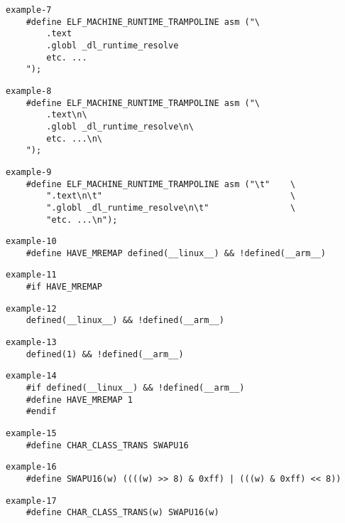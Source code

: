 \documentclass{jsarticle}
\begin{document}
\setlength{\baselineskip}{10pt}

\begin{verbatim}
example-7
    #define ELF_MACHINE_RUNTIME_TRAMPOLINE asm ("\
        .text
        .globl _dl_runtime_resolve
        etc. ...
    ");
\end{verbatim}

\begin{verbatim}
example-8
    #define ELF_MACHINE_RUNTIME_TRAMPOLINE asm ("\
        .text\n\
        .globl _dl_runtime_resolve\n\
        etc. ...\n\
    ");
\end{verbatim}

\begin{verbatim}
example-9
    #define ELF_MACHINE_RUNTIME_TRAMPOLINE asm ("\t"    \
        ".text\n\t"                                     \
        ".globl _dl_runtime_resolve\n\t"                \
        "etc. ...\n");
\end{verbatim}

\vspace{0pt}

\begin{verbatim}
example-10
    #define HAVE_MREMAP defined(__linux__) && !defined(__arm__)
\end{verbatim}

\begin{verbatim}
example-11
    #if HAVE_MREMAP
\end{verbatim}

\begin{verbatim}
example-12
    defined(__linux__) && !defined(__arm__)
\end{verbatim}

\begin{verbatim}
example-13
    defined(1) && !defined(__arm__)
\end{verbatim}

\begin{verbatim}
example-14
    #if defined(__linux__) && !defined(__arm__)
    #define HAVE_MREMAP 1
    #endif
\end{verbatim}

\vspace{0pt}

\begin{verbatim}
example-15
    #define CHAR_CLASS_TRANS SWAPU16
\end{verbatim}

\begin{verbatim}
example-16
    #define SWAPU16(w) ((((w) >> 8) & 0xff) | (((w) & 0xff) << 8))
\end{verbatim}

\begin{verbatim}
example-17
    #define CHAR_CLASS_TRANS(w) SWAPU16(w)
\end{verbatim}
\end{document}
